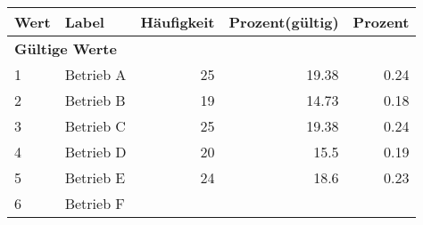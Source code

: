      \begin{longtable}{lXrrr}
     \toprule
     \textbf{Wert} & \textbf{Label} & \textbf{Häufigkeit} & \textbf{Prozent(gültig)} & \textbf{Prozent} \\
     \endhead
     \midrule
     \multicolumn{5}{l}{\textbf{Gültige Werte}}\\

     1 &
     \multicolumn{1}{X}{ Betrieb A   } &


       \num{25} &
       \num[round-mode=places,round-precision=2]{19.38} &
         \num[round-mode=places,round-precision=2]{0.24} \\

     2 &
     \multicolumn{1}{X}{ Betrieb B   } &


       \num{19} &
       \num[round-mode=places,round-precision=2]{14.73} &
         \num[round-mode=places,round-precision=2]{0.18} \\

     3 &
     \multicolumn{1}{X}{ Betrieb C   } &


       \num{25} &
       \num[round-mode=places,round-precision=2]{19.38} &
         \num[round-mode=places,round-precision=2]{0.24} \\

     4 &
     \multicolumn{1}{X}{ Betrieb D   } &


       \num{20} &
       \num[round-mode=places,round-precision=2]{15.5} &
         \num[round-mode=places,round-precision=2]{0.19} \\

     5 &
     \multicolumn{1}{X}{ Betrieb E   } &


       \num{24} &
       \num[round-mode=places,round-precision=2]{18.6} &
         \num[round-mode=places,round-precision=2]{0.23} \\

     6 &
     \multicolumn{1}{X}{ Betrieb F   } &



\end{longtable}
